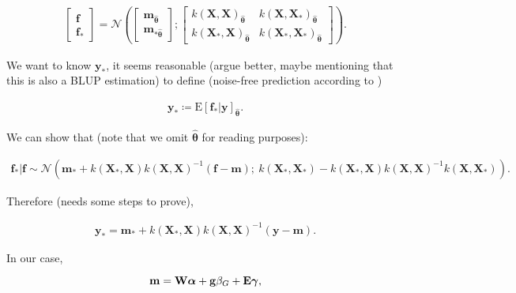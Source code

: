 \begin{align}
\left[\begin{array}{c}
            \mathbf{f} \\
            \mathbf{f}_*
\end{array}\right]  = \mathcal{N} \left( 
\left[\begin{array}{c}
    \mathbf{m}_{\hat{\boldsymbol{\theta}}} \\
    \mathbf{m}_{*\hat{\boldsymbol{\theta}}}
\end{array}\right];
\left[\begin{array}{cc}
    k(\mathbf{X}, \mathbf{X})_{\hat{\boldsymbol{\theta}}} & k(\mathbf{X}, \mathbf{X}_*)_{\hat{\boldsymbol{\theta}}} \\
    k(\mathbf{X}_*, \mathbf{X})_{\hat{\boldsymbol{\theta}}} & k(\mathbf{X}_*, \mathbf{X}_*)_{\hat{\boldsymbol{\theta}}}
\end{array}\right]
\right).
\end{align}

We want to know $\mathbf{y}_*$, it seems reasonable (argue better, maybe mentioning that this is also a BLUP estimation) to define (noise-free prediction according to \cite{rasmussen2003gaussian})

\begin{align}
    \mathbf{y}_* \coloneqq \mathrm{E}[\mathbf{f}_* | \mathbf{y}]_{\hat{\boldsymbol{\theta}}}.
\end{align}

We can show \cite{rasmussen2003gaussian} that (note that we omit $\hat{\boldsymbol{\theta}}$ for reading purposes):

\begin{align}
\mathbf{f}_* | \mathbf{f} \sim \mathcal{N} \left(
    \mathbf{m}_* +
        k(\mathbf{X}_*,\mathbf{X})k(\mathbf{X},\mathbf{X})^{-1}
        (\mathbf{f}-\mathbf{m})
    ;~
        k(\mathbf{X}_*,\mathbf{X}_*) - k(\mathbf{X}_*,\mathbf{X}) 
        k(\mathbf{X},\mathbf{X})^{-1}k(\mathbf{X},\mathbf{X}_*)
    \right).
\end{align}

Therefore (needs some steps to prove),

\begin{align}
\mathbf{y}_* = \mathbf{m}_* + k(\mathbf{X}_*,\mathbf{X})k(\mathbf{X},\mathbf{X})^{-1}(\mathbf{y}-\mathbf{m}).
\end{align}

In our case,

\begin{equation}
    \mathbf{m} = \mathbf{W}\boldsymbol{\alpha} + \mathbf{g} \beta_G + \mathbf{E} \boldsymbol{\gamma},
\end{equation}

